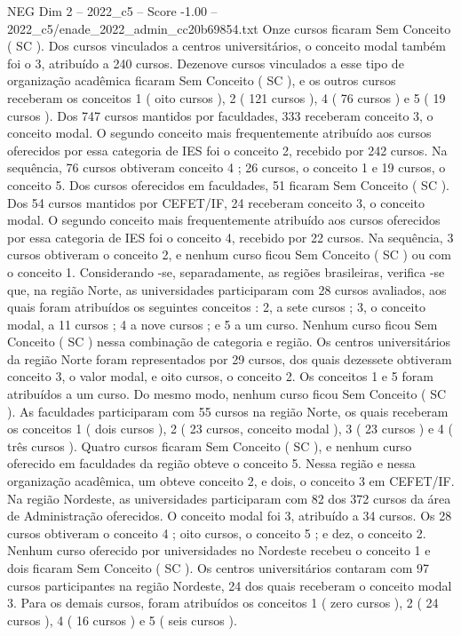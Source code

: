 \begin{textsample}{NEG Dim 2 – 2022\_c5 – Score -1.00 – 2022\_c5/enade\_2022\_admin\_cc20b69854.txt}
Onze cursos ficaram Sem Conceito ( SC ).
Dos cursos vinculados a centros universitários, o conceito modal também foi o 3, atribuído a 240 cursos.
Dezenove cursos vinculados a esse tipo de organização acadêmica ficaram Sem Conceito ( SC ), e os outros cursos receberam os conceitos 1 ( oito cursos ), 2 ( 121 cursos ), 4 ( 76 cursos ) e 5 ( 19 cursos ).
Dos 747 cursos mantidos por faculdades, 333 receberam conceito 3, o conceito modal.
O segundo conceito mais frequentemente atribuído aos cursos oferecidos por essa categoria de IES foi o conceito 2, recebido por 242 cursos.
Na sequência, 76 cursos obtiveram conceito 4 ; 26 cursos, o conceito 1 e 19 cursos, o conceito 5.
Dos cursos oferecidos em faculdades, 51 ficaram Sem Conceito ( SC ).
Dos 54 cursos mantidos por CEFET/IF, 24 receberam conceito 3, o conceito modal.
O segundo conceito mais frequentemente atribuído aos cursos oferecidos por essa categoria de IES foi o conceito 4, recebido por 22 cursos.
Na sequência, 3 cursos obtiveram o conceito 2, e nenhum curso ficou Sem Conceito ( SC ) ou com o conceito 1.
Considerando -se, separadamente, as regiões brasileiras, verifica -se que, na região Norte, as universidades participaram com 28 cursos avaliados, aos quais foram atribuídos os seguintes conceitos : 2, a sete cursos ; 3, o conceito modal, a 11 cursos ; 4 a nove cursos ; e 5 a um curso.
Nenhum curso ficou Sem Conceito ( SC ) nessa combinação de categoria e região.
Os centros universitários da região Norte foram representados por 29 cursos, dos quais dezessete obtiveram conceito 3, o valor modal, e oito cursos, o conceito 2.
Os conceitos 1 e 5 foram atribuídos a um curso.
Do mesmo modo, nenhum curso ficou Sem Conceito ( SC ).
As faculdades participaram com 55 cursos na região Norte, os quais receberam os conceitos 1 ( dois cursos ), 2 ( 23 cursos, conceito modal ), 3 ( 23 cursos ) e 4 ( três cursos ).
Quatro cursos ficaram Sem Conceito ( SC ), e nenhum curso oferecido em faculdades da região obteve o conceito 5.
Nessa região e nessa organização acadêmica, um obteve conceito 2, e dois, o conceito 3 em CEFET/IF.
Na região Nordeste, as universidades participaram com 82 dos 372 cursos da área de Administração oferecidos.
O conceito modal foi 3, atribuído a 34 cursos.
Os 28 cursos obtiveram o conceito 4 ; oito cursos, o conceito 5 ; e dez, o conceito 2.
Nenhum curso oferecido por universidades no Nordeste recebeu o conceito 1 e dois ficaram Sem Conceito ( SC ).
Os centros universitários contaram com 97 cursos participantes na região Nordeste, 24 dos quais receberam o conceito modal 3.
Para os demais cursos, foram atribuídos os conceitos 1 ( zero cursos ), 2 ( 24 cursos ), 4 ( 16 cursos ) e 5 ( seis cursos ).

\end{textsample}
